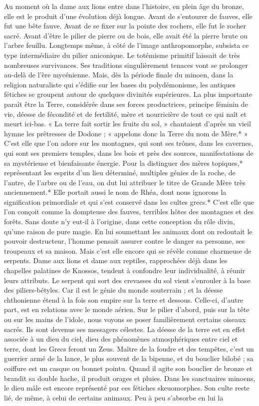 \documentclass[a4paper, 11pt, oneside, polutonikogreek, french]{article}
\begin{document}
Au moment où la dame aux lions entre dans l'histoire, en plein âge du bronze, elle est le produit d'une évolution déjà longue. Avant de s'entourer de fauves, elle fut une bête fauve. Avant de se fixer sur la pointe des rochers, elle fut le rocher sacré. Avant d'être le pilier de pierre ou de bois, elle avait été la pierre brute ou l'arbre feuillu. Longtemps même, à côté de l'image anthropomorphe, subsista ce type intermédiaire du pilier aniconique. Le totémisme primitif laissait de très nombreuses survivances. Ses traditions singulièrement tenaces vont se prolonger au-delà de l'ère mycénienne. Mais, dès la période finale du minoen, dans la religion naturaliste qui s'édifie sur les bases du polydémonisme, les antiques fétiches se groupent autour de quelques divinités supérieures. La plus importante paraît être la Terre, considérée dans ses forces productrices, principe féminin de vie, déesse de fécondité et de fertilité, mère et nourricière de tout ce qui naît et meurt ici-bas. « La terre fait sortir les fruits du sol, » chantaient d'après un vieil hymne les prêtresses de Dodone ; « appelons donc la Terre du nom de Mère.* » C'est elle que l'on adore sur les montagnes, qui sont ses trônes, dans les cavernes, qui sont ses premiers temples, dans les bois et près des sources, manifestations de sa mystérieuse et bienfaisante énergie. Pour la distinguer des mères topiques,* représentant les esprits d'un lieu déterminé, multiples génies de la roche, de l'antre, de l'arbre ou de l'eau, on dut lui attribuer le titre de Grande Mère très anciennement.* Elle portait aussi le nom de Rhéa, dont nous ignorons la signification primordiale et qui s'est conservé dans les cultes grecs.* C'est elle que l'on conçoit comme la dompteuse des fauves, terribles hôtes des montagnes et des forêts. Sans doute n'y eut-il à l'origine, dans cette conception du rôle divin, qu'une raison de pure magie. En lui soumettant les animaux dont on redoutait le pouvoir destructeur, l'homme pensait assurer contre le danger sa personne, ses troupeaux et sa maison. Mais c'est elle encore qui se révèle comme charmeuse de serpents. Dame aux lions et dame aux reptiles, rapprochées déjà dans les chapelles palatines de Knossos, tendent à confondre leur individualité, à réunir leurs attributs. Le serpent qui sort des crevasses du sol vient s'enrouler à la base des piliers-bétyles. Car il est le génie du monde souterrain ; et la déesse chthonienne étend à la fois son empire sur la terre et dessous. Celle-ci, d'autre part, est en relations avec le monde aérien. Sur le pilier d'abord, puis sur la tête ou sur les mains de l'idole, nous voyons se poser familièrement certains oiseaux sacrés. Ils sont devenus ses messagers célestes. La déesse de la terre est en effet associée à un dieu du ciel, dieu des phénomènes atmosphériques entre ciel et terre, dont les Grecs feront un Zeus. Maître de la foudre et des tempêtes, c'est un guerrier armé de la lance, le plus souvent de la bipenne, et du bouclier bilobé ; sa coiffure est un casque ou bonnet pointu. Quand il agite son bouclier de bronze et brandit sa double hache, il produit orages et pluies. Dans les sanctuaires minoens, le dieu mâle est encore représenté par ces fétiches skeuomorphes. Son culte reste lié, de même, à celui de certains animaux. Peu à peu s'absorbe en lui la 
\end{document}
